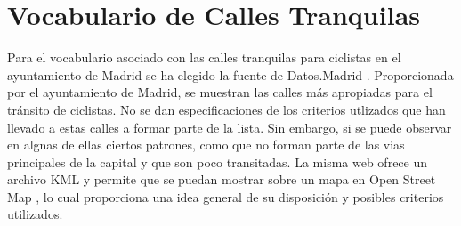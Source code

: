 \section{Vocabulario de Calles Tranquilas}

Para el vocabulario asociado con las calles tranquilas para ciclistas en el ayuntamiento de Madrid se ha elegido la fuente de Datos.Madrid \cite{datosMadrid_callesTranquilas}.
Proporcionada por el ayuntamiento de Madrid, se muestran las calles más apropiadas para el tránsito de ciclistas. No se dan especificaciones de los criterios utlizados que han llevado a estas calles a formar parte de la lista. Sin embargo, si se puede observar en algnas de ellas ciertos patrones, como que no forman parte de las vias principales de la capital y que son poco transitadas. La misma web ofrece un archivo KML y permite que se puedan mostrar sobre un mapa en Open Street Map \cite{openStreetMapCallesTranquilas}, lo cual proporciona una idea general de su disposición y posibles criterios utilizados.
\newline


